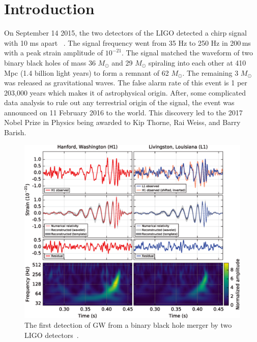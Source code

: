 \documentclass{ttuthes2007}
\begin{document}
\chapter{\textbf{Introduction}}
    On September 14 2015, the two detectors of the \ac{LIGO} detected a chirp signal with 10 ms apart ~\cite{Abbott_2016}. The
signal frequency went from 35 Hz to 250 Hz in 200\,ms with a peak strain amplitude of $10^{-21}$.
The signal matched the waveform of two binary black holes of mass 36 $M_\odot$
and 29 $M_\odot$ spiraling into each other at 410\,Mpc (1.4 billion light years) to
form a remnant of 62 $M_\odot$. The remaining 3 $M_\odot$ was released as
gravitational waves.  The false alarm rate of this event is 1 per 203,000 years
 which makes it of astrophysical
origin.  After, some complicated data analysis to rule out any terrestrial origin
of the signal, the event was announced on 11 February 2016 to the world. This
discovery led to the 2017 Nobel Prize in Physics being awarded to Kip Thorne,
Rai Weiss, and Barry Barish.
\begin{figure}[bht!]                                                              
        \includegraphics[width=\textwidth]{figure/BBH.png}                          
	\caption{The first detection of \ac{GW} from a binary black hole
merger by two \ac{LIGO} detectors~\cite{Abbott_2016}.}
\end{figure}      
\end{document}
